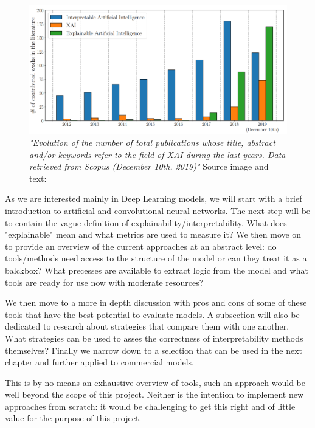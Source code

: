 \documentclass[proposal]{softeng}
\begin{document}
\begin{figure}[h!]
\centering
  \includegraphics[scale=0.5]{images/evolution_publications.png}
  \caption{\textit{"Evolution of the number of total publications whose title, abstract and/or keywords refer to the field of XAI during the last years. Data retrieved from Scopus (December 10th, 2019)"} Source image and text:\cite{BarredoArrietaAlejandro2020EAIX}}
  \label{fig:evolution_publications}
\end{figure}


As we are interested mainly in Deep Learning models, we will start with a brief introduction to artificial and convolutional neural networks. The next step will be to contain the vague definition of explainability/interpretability. What does "explainable" mean and what metrics are used to measure it? We then move on to provide an overview of the current approaches at an abstract level: do tools/methods need access to the structure of the model or can they treat it as a balckbox? What precesses are available to extract logic from the model and what tools are ready for use now with moderate resources?

We then move to a more in depth discussion with pros and cons of some of these tools that have the best potential to evaluate models. A subsection will also be dedicated to research about strategies that compare them with one another. What strategies can be used to asses the correctness of interpretability methods themselves? Finally we narrow down to a selection that can be used in the next chapter and further applied to commercial models. 

This is by no means an exhaustive overview of tools, such an approach would be well beyond the scope of this project. Neither is the intention to implement new approaches from scratch: it would be challenging to get this right and of little value for the purpose of this project.
\end{document}

